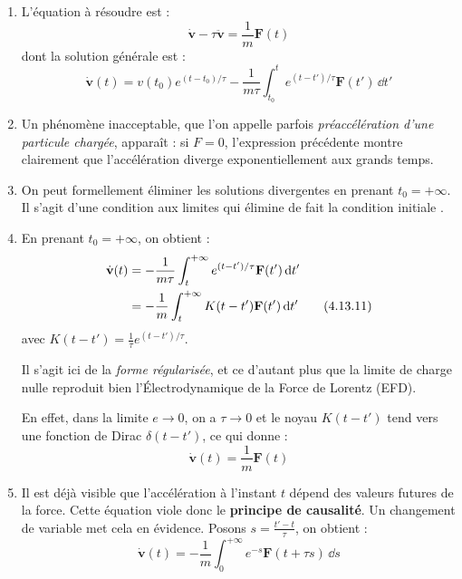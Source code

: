 \documentclass[a4paper,10pt]{report}
\begin{document}
		\begin{enumerate}
			\item L'équation à résoudre est :
			\begin{equation*}
				\dot{\textbf{v}} - \tau \ddot{\textbf{v}} = \frac{1}{m} \textbf{F}(t)
			\end{equation*}
			dont la solution générale est :
			\begin{equation}
				\dot{\textbf{v}}(t) = v(t_0) e^{(t - t_0)/\tau} - \frac{1}{m\tau} \int_{t_0}^t e^{(t - t')/\tau} \textbf{{F}}(t')\, \dd t' \tag{4.13.10}\label{eq:4.13.10}
			\end{equation}
			
			\item Un phénomène inacceptable, que l'on appelle parfois \emph{préaccélération d'une particule chargée}, apparaît : si $F = 0$, l’expression précédente montre clairement que l’accélération diverge exponentiellement aux grands temps.
			
			\item On peut formellement éliminer les solutions divergentes en prenant $t_0 = +\infty$. Il s'agit d'une condition aux limites qui élimine de fait la \og condition initiale \fg.
			
			\item En prenant $t_0 = +\infty$, on obtient :
			\begin{align}
				\dot{\textbf{v}}(t) &= -\frac{1}{m\tau} \int_t^{+\infty} e^{(t - t')/\tau} \textbf{{F}}(t')\, \dd t' \notag \\
				&= -\frac{1}{m} \int_t^{+\infty} K(t - t') \textbf{{F}}(t')\, \dd t' \tag{4.13.11}
			\end{align}
			avec $K(t - t') = \frac{1}{\tau} e^{(t - t')/\tau}$.
			
			Il s'agit ici de la \emph{forme régularisée}, et ce d'autant plus que la limite de charge nulle reproduit bien l’Électrodynamique de la Force de Lorentz (EFD).
			
			En effet, dans la limite $e \to 0$, on a $\tau \to 0$ et le noyau $K(t - t')$ tend vers une fonction de Dirac $\delta(t - t')$, ce qui donne :
			\[
			\dot{\textbf{v}}(t) = \frac{1}{m} \textbf{F}(t)
			\]
			
			\item Il est déjà visible que l'accélération à l'instant $t$ dépend des valeurs futures de la force. Cette équation viole donc le \textbf{principe de causalité}. Un changement de variable met cela en évidence. Posons $s = \frac{t' - t}{\tau}$, on obtient :
			\begin{equation}
				\dot{\textbf{v}}(t) = -\frac{1}{m} \int_0^{+\infty} e^{-s} \textbf{{F}}(t + \tau s)\, \dd s \tag{4.13.12}
			\end{equation}
			

\end{enumerate}
\end{document}
